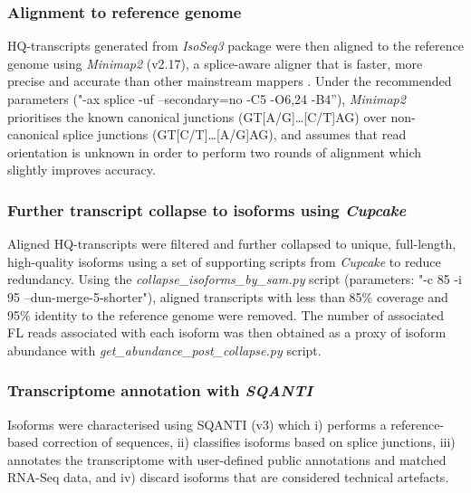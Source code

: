 \begin{figure}[htp]
	\label{fig:isoseq3_tool}
\end{figure}

\newpage
\subsubsection{Alignment to reference genome} 
HQ-transcripts generated from \textit{IsoSeq3} package were then aligned to the reference genome using \textit{Minimap2}\cite{Li2018} (v2.17), a splice-aware aligner that is faster, more precise and accurate than other mainstream mappers \cite{SimirKriZanoviC2018,Tang2020}. Under the recommended parameters ("-ax splice -uf --secondary=no -C5 -O6,24 -B4”), \textit{Minimap2} prioritises the known canonical junctions (GT[A/G]…[C/T]AG) over non-canonical splice junctions (GT[C/T]…[A/G]AG), and assumes that read orientation is unknown in order to perform two rounds of alignment which slightly improves accuracy. 

\subsubsection{Further transcript collapse to isoforms using \textit{Cupcake}}
Aligned HQ-transcripts were filtered and further collapsed to unique, full-length, high-quality isoforms using a set of supporting scripts from \textit{Cupcake} to reduce redundancy. Using the \textit{collapse\_isoforms\_by\_sam.py} script (parameters: "-c 85 -i 95 --dun-merge-5-shorter"), aligned transcripts with less than 85\% coverage and 95\% identity to the reference genome were removed. The number of associated FL reads associated with each isoform was then obtained as a proxy of isoform abundance with \textit{get\_abundance\_post\_collapse.py} script. 

\subsubsection{Transcriptome annotation with \textit{SQANTI}}
\label{section: sqanti_annotations}
Isoforms were characterised using SQANTI\cite{Tardaguila2018} (v3) which i) performs a reference-based correction of sequences, ii) classifies isoforms based on splice junctions, iii) annotates the transcriptome with user-defined public annotations and matched RNA-Seq data, and iv) discard isoforms that are considered technical artefacts. 

